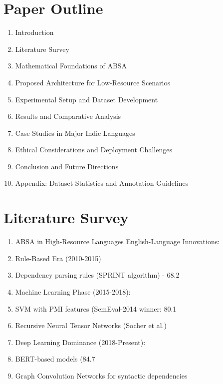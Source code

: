\documentclass[]{article}
\begin{document}
\section{Paper Outline}
\begin{enumerate}
\item Introduction
\item Literature Survey
\item Mathematical Foundations of ABSA
\item Proposed Architecture for Low-Resource Scenarios
\item Experimental Setup and Dataset Development
\item Results and Comparative Analysis
\item Case Studies in Major Indic Languages
\item Ethical Considerations and Deployment Challenges
\item Conclusion and Future Directions
\item Appendix: Dataset Statistics and Annotation Guidelines
\end{enumerate}
\section{Literature Survey}
\begin{enumerate}
\item ABSA in High-Resource Languages
English-Language Innovations:
\item Rule-Based Era (2010-2015)
\item Dependency parsing rules (SPRINT algorithm) - 68.2%
\item Machine Learning Phase (2015-2018):
\item SVM with PMI features (SemEval-2014 winner: 80.1%
\item Recursive Neural Tensor Networks (Socher et al.)
\item Deep Learning Dominance (2018-Present):
\item BERT-based models (84.7%
\item Graph Convolution Networks for syntactic dependencies
\end{enumerate}
\end{document}
